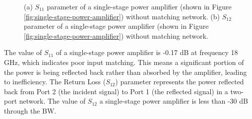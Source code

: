 \begin{figure}[H]
\begin{subfigure}{0.49\textwidth}
    \caption{}
     \label{fig:single-stage-without-cadence-s12}
  \end{subfigure}
  \caption{(a) $S_{11}$ parameter of a single-stage power amplifier (shown in Figure \ref{fig:single-stage-power-amplifier}) without matching network. (b) $S_{12}$ parameter of a single-stage power amplifier (shown in Figure \ref{fig:single-stage-power-amplifier}) without matching network.}
  \label{fig:single-stage-without-cadence-s11-s12}
\end{figure}

The value of $S_{11}$ of a single-stage power amplifier is -0.17 dB at frequency 18 GHz, which indicates poor input matching. This means a significant portion of the power is being reflected back rather than absorbed by the amplifier, leading to inefficiency. The Return Loss ($S_{12}$) parameter represents the power reflected back from Port 2 (the incident signal) to Port 1 (the reflected signal) in a two-port network. The value of $S_{12}$ a single-stage power amplifier is less than -30 dB through the BW.
